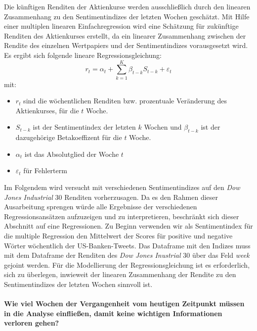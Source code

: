 Die künftigen Renditen der Aktienkurse werden ausschließlich
durch den linearen Zusammenhang zu den Sentimentindizes der letzten Wochen geschätzt. Mit Hilfe einer multiplen linearen Einfachregression wird eine Schätzung für zukünftige Renditen des Aktienkurses erstellt, da ein linearer Zusammenhang zwischen der Rendite des einzelnen Wertpapiers und der Sentimentindizes vorausgesetzt wird. Es ergibt sich folgende lineare Regressionsgleichung:
\begin{equation}
r_{t}=\alpha_{t}+ \sum_{k=1}^{K} \beta_{t-k} S_{t-k}+\varepsilon_{t}
\end{equation}
mit:
\begin{itemize}
	\item  $r_{t}$ sind die wöchentlichen Renditen bzw. prozentuale Veränderung des Aktienkurses, für die $t$ Woche.
	\item $S_{t-k}$ ist der Sentimentindex der letzten $k$ Wochen und $\beta_{t-k}$ ist der dazugehörige Betakoeffizent für die $t$ Woche.
	\item $\alpha_{t}$ ist das Absolutglied der Woche $t$
	\item $\varepsilon_{t}$ für  Fehlerterm 
\end{itemize}
Im Folgendem wird versucht mit verschiedenen Sentimentindizes auf den \textit{Dow Jones Industrial} $30$ Renditen vorherzusagen. Da es den Rahmen dieser Ausarbeitung sprengen würde alle Ergebnisse der verschiedenen Regressionsansätzen aufzuzeigen und zu interpretieren, beschränkt sich dieser Abschnitt auf eine Regressionen. Zu Beginn verwenden wir als Sentimentindex für die multiple Regression den Mittelwert der Scores für positive und negative Wörter wöchentlich der US-Banken-Tweets. Das Dataframe mit den Indizes muss mit dem Dataframe der Renditen des \textit{Dow Jones Inustrial} $30$  über das Feld \textit{week} gejoint werden. Für die Modellierung der Regressionsgleichung ist es erforderlich, sich zu überlegen, inwieweit der linearen Zusammenhang der Rendite zu den Sentimentindizes der letzten Wochen sinnvoll ist.\\
\\
\textbf{Wie viel Wochen der Vergangenheit vom heutigen Zeitpunkt müssen in die Analyse einfließen, damit keine wichtigen Informationen verloren gehen?} 
\\
\\
